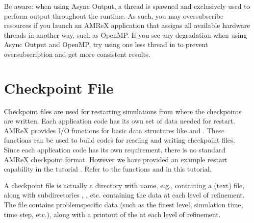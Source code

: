 \documentclass[letterpaper,10pt,english]{sphinxmanual}
\begin{document}
\sphinxAtStartPar
Be aware: when using Async Output, a thread is spawned and exclusively used
to perform output throughout the runtime.  As such, you may oversubscribe
resources if you launch an AMReX application that assigns all available
hardware threads in another way, such as OpenMP.  If you see any degradation
when using Async Output and OpenMP, try using one less thread in
 to prevent oversubscription and get more consistent
results.


\section{Checkpoint File}
\label{\detokenize{IO:checkpoint-file}}
\sphinxAtStartPar
Checkpoint files are used for restarting simulations from where the
checkpoints are written. Each application code has its own set of
data needed for restart. AMReX provides I/O functions for basic
data structures like  and . These
functions can be used to build codes for reading and writing
checkpoint files. Since each application code has its own
requirement, there is no standard AMReX checkpoint format.
However we have provided an example restart capability in the tutorial
.
Refer to the functions  and
 in this tutorial.

\sphinxAtStartPar
A checkpoint file is actually a directory with name, e.g.,
 containing a  (text) file, along with
subdirectories , , etc. containing the
 data at each level of refinement.
The  file contains problem\sphinxhyphen{}specific data (such as the
finest level, simulation time, time step, etc.), along with a printout
of the  at each level of refinement.
\end{document}
